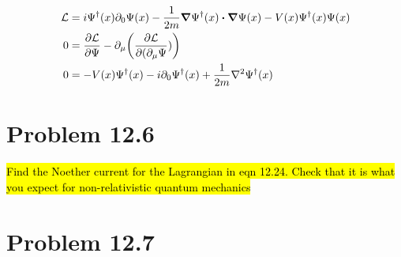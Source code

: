 \documentclass{article}
\begin{document}
\begin{align*}
    \mathcal{L} & =i\Psi^\dagger(x)\partial_0\Psi(x)-\frac{1}{2m}\grad\Psi^\dagger(x)\vdot\grad\Psi(x)-V(x)\Psi^\dagger(x)\Psi(x) \\
    0           & =\pdv{\mathcal{L}}{\Psi}-\partial_\mu\pqty{\pdv{\mathcal{L}}{(\partial_\mu \Psi})}                              \\
    0           & =-V(x)\Psi^\dagger(x)-i\partial_0\Psi^\dagger(x)+\frac{1}{2m}\laplacian{\Psi^\dagger(x)}
\end{align*}













\section*{Problem 12.6}
\begin{quoting}
    \hl{Find the Noether current for the Lagrangian in eqn 12.24. Check that it is what you expect for non-relativistic quantum mechanics}
\end{quoting}


\section*{Problem 12.7}
\end{document}
